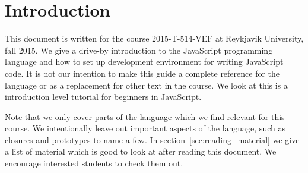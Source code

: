 \section{Introduction}\label{sec:introduction}
This document is written for the course 2015-T-514-VEF at Reykjavik University, fall 2015. We give a drive-by introduction to the JavaScript programming language and how to set up development environment for writing JavaScript code. It is not our intention to make this guide a complete reference for the language or as a replacement for other text in the course. We look at this is a introduction level tutorial for beginners in JavaScript.

Note that we only cover parts of the language which we find relevant for this course. We intentionally leave out important aspects of the language, such as closures and prototypes to name a few. In section~\ref{sec:reading_material} we give a list of material which is good to look at after reading this document. We encourage interested students to check them out.
